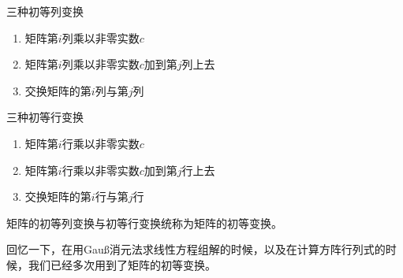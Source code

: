 
\begin{frame}

\begin{block}{三种初等列变换}
\begin{enumerate}
\item 矩阵第$i$列乘以非零实数$c$
\item 矩阵第$i$列乘以非零实数$c$加到第$j$列上去
\item 交换矩阵的第$i$列与第$j$列
\end{enumerate}
\end{block}

\pause

\begin{block}{三种初等行变换}
\begin{enumerate}
\item 矩阵第$i$行乘以非零实数$c$
\item 矩阵第$i$行乘以非零实数$c$加到第$j$行上去
\item 交换矩阵的第$i$行与第$j$行
\end{enumerate}
\end{block}

\pause

矩阵的初等列变换与初等行变换统称为矩阵的初等变换。

\pause

回忆一下，在用Gau{\ss}消元法求线性方程组解的时候，以及在计算方阵行列式的时候，我们已经多次用到了矩阵的初等变换。

\end{frame}


